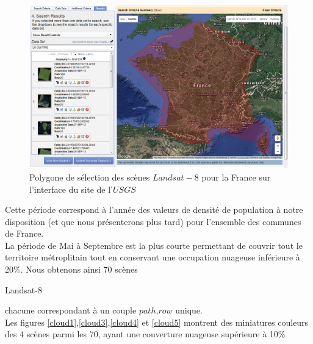 \documentclass{book}
\begin{document}
\begin{figure}[H]
\begin{center}
\includegraphics[scale=0.5]{images/france-selection.png}
\end{center}
\caption{Polygone de sélection des scènes $Landsat-8$ pour la France sur l'interface du site de l'$USGS$}
\label{selection_france}
\end{figure}

Cette période correspond à l'année des valeurs de densité de population à notre disposition (et que nous présenterons plus tard) pour l'ensemble des communes de France.\\
La période de Mai à Septembre est la plus courte permettant de couvrir tout le territoire métroplitain tout en conservant une occupation
nuageuse inférieure à 20\%.
Nous obtenons ainsi 70 scènes \begin{itshape}Landsat-8\end{itshape} chacune correspondant à un couple $path$,$row$ unique.\\
Les figures \ref{cloud1},\ref{cloud3},\ref{cloud4} et \ref{cloud5} montrent des miniatures couleurs des 4 scènes parmi les 70, ayant une couverture 
nuageuse supérieure à 10\%
\end{document}
